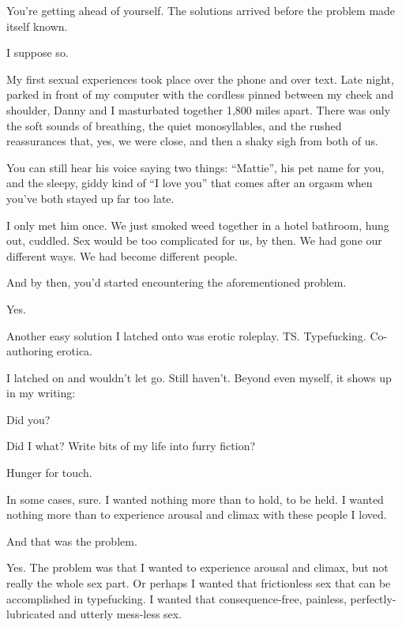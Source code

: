 \begin{ally}
You're getting ahead of yourself. The solutions arrived before the problem made itself known.
\end{ally}
I suppose so.

My first sexual experiences took place over the phone and over text. Late night, parked in front of my computer with the cordless pinned between my cheek and shoulder, Danny and I masturbated together 1,800 miles apart. There was only the soft sounds of breathing, the quiet monosyllables, and the rushed reassurances that, yes, we were close, and then a shaky sigh from both of us.

\begin{ally}
You can still hear his voice saying two things: ``Mattie'', his pet name for you, and the sleepy, giddy kind of ``I love you'' that comes after an orgasm when you've both stayed up far too late.
\end{ally}
I only met him once. We just smoked weed together in a hotel bathroom, hung out, cuddled. Sex would be too complicated for us, by then. We had gone our different ways. We had become different people.

\begin{ally}
And by then, you'd started encountering the aforementioned problem.
\end{ally}
Yes.

Another easy solution I latched onto was erotic roleplay. TS. Typefucking. Co-authoring erotica.

I latched on and wouldn't let go. Still haven't. Beyond even myself, it shows up in my writing:

\begin{ally}
Did you?
\end{ally}
Did I what? Write bits of my life into furry fiction?

\begin{ally}
Hunger for touch.
\end{ally}
In some cases, sure. I wanted nothing more than to hold, to be held. I wanted nothing more than to experience arousal and climax with these people I loved.

\begin{ally}
And that was the problem.
\end{ally}
Yes. The problem was that I wanted to experience arousal and climax, but not really the whole sex part. Or perhaps I wanted that frictionless sex that can be accomplished in typefucking. I wanted that consequence-free, painless, perfectly-lubricated and utterly mess-less sex.

